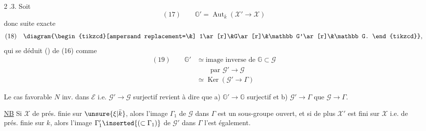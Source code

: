 \textcircled{2.3.} Soit
\[
(17)\qquad\mathbb G'=\operatorname{Aut}_{\bar k}(\mathcal X'\longrightarrow\mathcal X)
\]
 donc suite exacte
\[
(18)\quad\diagram{\begin{tikzcd}[ampersand replacement=\&]
1\ar[r]\&G\ar[r]\&\mathbb G'\ar[r]\&\mathbb G.
\end{tikzcd}},
\]
qui se déduit () de (16) comme
\[
\begin{aligned}
(19)\qquad\mathbb G'&\simeq\text{image inverse de }\mathbb G\subset\mathcal G\\
&\qquad\text{par }\mathcal G'\longrightarrow\mathcal G\\
&\simeq\operatorname{Ker}(\mathcal G'\longrightarrow\Gamma)
\end{aligned}
\]

Le cas favorable $N$ inv. dans $\mathcal E$ i.e. $\mathcal G'\to\mathcal G$ surjectif revient à dire que a) $\mathbb G'\to\mathbb G$ surjectif et b) $\mathcal G'\to\Gamma$   que $\mathcal G\to\Gamma$.


\uline{NB} Si $\mathcal X$ de prés. finie sur $\unsure{\xi|\bar k}$, alors l'image $\Gamma_1$ de $\mathcal G$ dans $\Gamma$ est un sous-groupe ouvert, et si de plus $\mathcal X'$ est fini sur $\mathcal X$ i.e. de prés. finie sur $k$, alors l'image $\Gamma'_1\inserted{(\subset\Gamma_1)}$ de $\mathcal G'$ dans $\Gamma$ l'est également.


